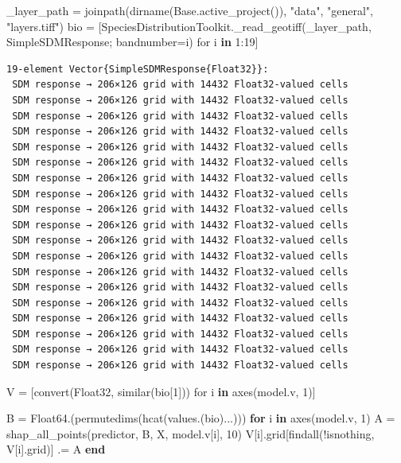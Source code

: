 \documentclass[
  letterpaper,
]{scrbook}
\newenvironment{Shaded}{\begin{snugshade}}{\end{snugshade}}
\newcommand{\BuiltInTok}[1]{\textcolor[rgb]{0.00,0.23,0.31}{#1}}
\newcommand{\ControlFlowTok}[1]{\textcolor[rgb]{0.00,0.23,0.31}{\textbf{#1}}}
\newcommand{\DataTypeTok}[1]{\textcolor[rgb]{0.68,0.00,0.00}{#1}}
\newcommand{\FloatTok}[1]{\textcolor[rgb]{0.68,0.00,0.00}{#1}}
\newcommand{\FunctionTok}[1]{\textcolor[rgb]{0.28,0.35,0.67}{#1}}
\newcommand{\KeywordTok}[1]{\textcolor[rgb]{0.00,0.23,0.31}{\textbf{#1}}}
\newcommand{\NormalTok}[1]{\textcolor[rgb]{0.00,0.23,0.31}{#1}}
\newcommand{\OperatorTok}[1]{\textcolor[rgb]{0.37,0.37,0.37}{#1}}
\newcommand{\StringTok}[1]{\textcolor[rgb]{0.13,0.47,0.30}{#1}}
\begin{document}
\begin{Shaded}
\begin{Highlighting}[]
\NormalTok{\_layer\_path }\OperatorTok{=} \FunctionTok{joinpath}\NormalTok{(}\FunctionTok{dirname}\NormalTok{(}\BuiltInTok{Base}\NormalTok{.}\FunctionTok{active\_project}\NormalTok{()), }\StringTok{"data"}\NormalTok{, }\StringTok{"general"}\NormalTok{, }\StringTok{"layers.tiff"}\NormalTok{)}
\NormalTok{bio }\OperatorTok{=}\NormalTok{ [SpeciesDistributionToolkit.}\FunctionTok{\_read\_geotiff}\NormalTok{(\_layer\_path, SimpleSDMResponse; bandnumber}\OperatorTok{=}\NormalTok{i) for i }\KeywordTok{in} \FloatTok{1}\OperatorTok{:}\FloatTok{19}\NormalTok{]}
\end{Highlighting}
\end{Shaded}

\begin{verbatim}
19-element Vector{SimpleSDMResponse{Float32}}:
 SDM response → 206×126 grid with 14432 Float32-valued cells
 SDM response → 206×126 grid with 14432 Float32-valued cells
 SDM response → 206×126 grid with 14432 Float32-valued cells
 SDM response → 206×126 grid with 14432 Float32-valued cells
 SDM response → 206×126 grid with 14432 Float32-valued cells
 SDM response → 206×126 grid with 14432 Float32-valued cells
 SDM response → 206×126 grid with 14432 Float32-valued cells
 SDM response → 206×126 grid with 14432 Float32-valued cells
 SDM response → 206×126 grid with 14432 Float32-valued cells
 SDM response → 206×126 grid with 14432 Float32-valued cells
 SDM response → 206×126 grid with 14432 Float32-valued cells
 SDM response → 206×126 grid with 14432 Float32-valued cells
 SDM response → 206×126 grid with 14432 Float32-valued cells
 SDM response → 206×126 grid with 14432 Float32-valued cells
 SDM response → 206×126 grid with 14432 Float32-valued cells
 SDM response → 206×126 grid with 14432 Float32-valued cells
 SDM response → 206×126 grid with 14432 Float32-valued cells
 SDM response → 206×126 grid with 14432 Float32-valued cells
 SDM response → 206×126 grid with 14432 Float32-valued cells
\end{verbatim}

\begin{Shaded}
\begin{Highlighting}[]
\NormalTok{V }\OperatorTok{=}\NormalTok{ [}\FunctionTok{convert}\NormalTok{(}\DataTypeTok{Float32}\NormalTok{, }\FunctionTok{similar}\NormalTok{(bio[}\FloatTok{1}\NormalTok{])) for i }\KeywordTok{in} \FunctionTok{axes}\NormalTok{(model.v, }\FloatTok{1}\NormalTok{)]}

\NormalTok{B }\OperatorTok{=} \FunctionTok{Float64}\NormalTok{.(}\FunctionTok{permutedims}\NormalTok{(}\FunctionTok{hcat}\NormalTok{(}\FunctionTok{values}\NormalTok{.(bio)}\OperatorTok{...}\NormalTok{)))}
\ControlFlowTok{for}\NormalTok{ i }\KeywordTok{in} \FunctionTok{axes}\NormalTok{(model.v, }\FloatTok{1}\NormalTok{)}
\NormalTok{    A }\OperatorTok{=} \FunctionTok{shap\_all\_points}\NormalTok{(predictor, B, X, model.v[i], }\FloatTok{10}\NormalTok{)}
\NormalTok{    V[i].grid[}\FunctionTok{findall}\NormalTok{(!isnothing, V[i].grid)] }\OperatorTok{.=}\NormalTok{ A}
\ControlFlowTok{end}
\end{Highlighting}
\end{Shaded}
\end{document}
